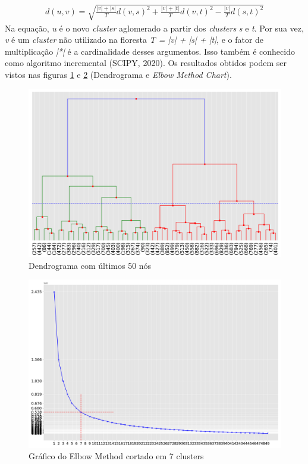 \documentclass[twocolumn]{rbef}
\newcommand{\1}{\mathbbm{1}}
\begin{document}
\begin{align*}
d(u, v) = \sqrt{\frac{|v| + |s|}{T} d(v, s)^2 + \frac{|v| + |t|}{T} d(v, t)^2 - \frac{|v|}{T} d(s, t)^2}
\end{align*}
Na equação, \emph{u} é o novo \emph{cluster} aglomerado a partir dos \emph{clusters} \emph{s} e \emph{t}. Por sua vez, \emph{v} é um \emph{cluster} não utilizado na floresta \emph{T = |v| + |s| + |t|}, e o fator de multiplicação \emph{|*|} é a cardinalidade desses argumentos. Isso também é conhecido como algoritmo incremental (SCIPY, 2020)\cite{SCIPY}. Os resultados obtidos podem ser vistos nas figuras \ref{fig2} e \ref{fig3} (Dendrograma e \emph{Elbow Method Chart}).
\begin{figure}[!htb]
  \includegraphics[scale=0.22]{2. Dendrograma Clientes 7 clusteres.png}
  \caption{Dendrograma com últimos 50 nós}
  \label{fig2}
\end{figure}
\begin{figure}[!htb]
  \includegraphics[scale=0.22]{3. Elbow - Clientes 7 clusteres.png}
  \caption{Gráfico do Elbow Method cortado em 7 clusters}
  \label{fig3}
\end{figure}
\end{document}
